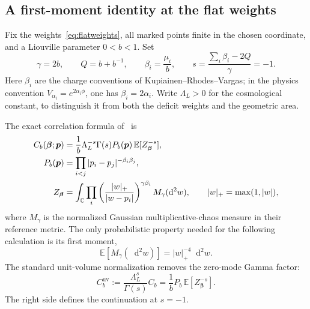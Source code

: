 \documentclass[11pt,a4paper]{article}
\numberwithin{equation}{section}
\theoremstyle{definition}
\theoremstyle{remark}
\newcommand{\dd}{\mathop{}\!\mathrm d}
\newcommand{\CC}{\mathbb C}
\begin{document}
\subsection{A first-moment identity at the flat weights}

Fix the weights~\eqref{eq:flatweights}, all marked points finite in the
chosen coordinate, and a Liouville parameter $0<b<1$. Set
\begin{equation}
 \gamma=2b,\qquad Q=b+b^{-1},\qquad
 \beta_i=\frac{\mu_i}{b},\qquad
 s=\frac{\sum_i\beta_i-2Q}{\gamma}=-1.
 \label{eq:Liouvilleflatparameters}
\end{equation}
Here $\beta_i$ are the charge conventions of
Kupiainen--Rhodes--Vargas; in the physics convention
$V_{\alpha_i}=e^{2\alpha_i\phi}$, one has $\beta_i=2\alpha_i$.
Write $\Lambda_L>0$ for the cosmological constant, to distinguish it
from both the deficit weights and the geometric area.

The exact correlation formula of~\cite[eqs.~(2.11)--(2.15)]{KRV}
is
\begin{align}
 C_b(\boldsymbol\beta;\boldsymbol p)
   &=\frac1b\Lambda_L^{-s}\Gamma(s)
      P_b(\boldsymbol p)\,\mathbb E[Z_{\boldsymbol\beta}^{-s}],
       \label{eq:LiouvilleGMC}\\
 P_b(\boldsymbol p)
   &=\prod_{i<j}|p_i-p_j|^{-\beta_i\beta_j},\notag\\
 Z_{\boldsymbol\beta}
   &=\int_{\CC}\prod_i
       \left(\frac{|w|_+}{|w-p_i|}\right)^{\gamma\beta_i}
       M_\gamma(\dd^2w),\qquad |w|_+=\max(1,|w|),\notag
\end{align}
where $M_\gamma$ is the normalized Gaussian multiplicative-chaos
measure in their reference metric. The only probabilistic property
needed for the following calculation is its first moment,
\begin{equation}
 \mathbb E[M_\gamma(\dd^2w)]=|w|_+^{-4}\dd^2w.
 \label{eq:GMCfirstmoment}
\end{equation}
The standard unit-volume normalization removes the zero-mode
Gamma factor:
\begin{equation}
 C_b^{\mathrm{uv}}
       :=\frac{\Lambda_L^s}{\Gamma(s)}C_b
        =\frac1b P_b\,\mathbb E[Z_{\boldsymbol\beta}^{-s}].
 \label{eq:unitvolumeLiouville}
\end{equation}
The right side defines the continuation at $s=-1$.
\end{document}
